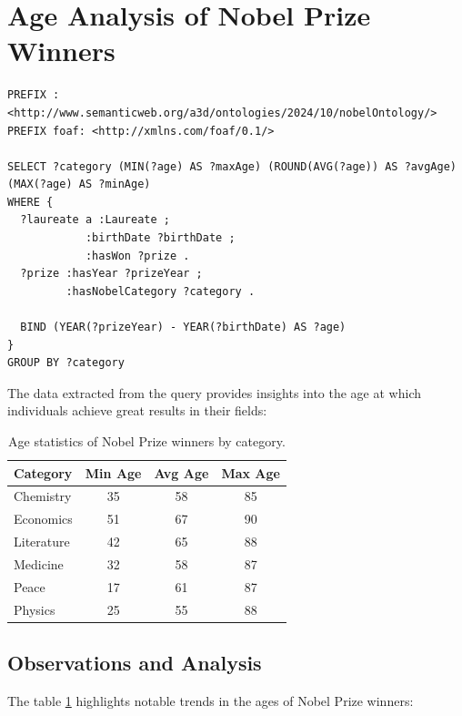 \documentclass{article}
\begin{document}
\section{Age Analysis of Nobel Prize Winners}
\begin{lstlisting}
PREFIX : <http://www.semanticweb.org/a3d/ontologies/2024/10/nobelOntology/>
PREFIX foaf: <http://xmlns.com/foaf/0.1/>

SELECT ?category (MIN(?age) AS ?maxAge) (ROUND(AVG(?age)) AS ?avgAge) (MAX(?age) AS ?minAge)
WHERE {
  ?laureate a :Laureate ;
            :birthDate ?birthDate ;
            :hasWon ?prize .
  ?prize :hasYear ?prizeYear ;
         :hasNobelCategory ?category .

  BIND (YEAR(?prizeYear) - YEAR(?birthDate) AS ?age)
}
GROUP BY ?category
\end{lstlisting}

The data extracted from the query provides insights into the age at which individuals achieve great results in
their fields:

\begin{table}[h!]
\centering
\caption{Age statistics of Nobel Prize winners by category.}
\begin{tabular}{|l|c|c|c|}
\hline
\textbf{Category} & \textbf{Min Age} & \textbf{Avg Age} & \textbf{Max Age} \\ \hline
Chemistry    & 35 & 58 & 85 \\ \hline
Economics    & 51 & 67 & 90 \\ \hline
Literature   & 42 & 65 & 88 \\ \hline
Medicine     & 32 & 58 & 87 \\ \hline
Peace        & 17 & 61 & 87 \\ \hline
Physics      & 25 & 55 & 88 \\ \hline
\end{tabular}
\label{tab:age_analysis}
\end{table}

\subsection{Observations and Analysis}
The table \ref{tab:age_analysis} highlights notable trends in the ages of Nobel Prize winners:
\end{document}
